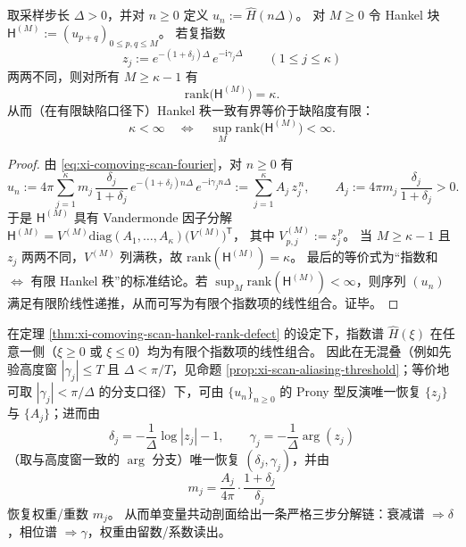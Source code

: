 \begin{theorem}\label{thm:xi-comoving-scan-hankel-rank-defect}
取采样步长 \(\Delta>0\)，并对 \(n\ge 0\) 定义
\(
u_n:=\widehat H(n\Delta)
\)。
对 \(M\ge 0\) 令 Hankel 块
\(
\mathsf H^{(M)}:=(u_{p+q})_{0\le p,q\le M}
\)。
若复指数
\[
z_j:=e^{-(1+\delta_j)\Delta}\,e^{-\mathrm{i}\gamma_j\Delta}\qquad(1\le j\le \kappa)
\]
两两不同，则对所有 \(M\ge \kappa-1\) 有
\[
\boxed{\;\mathrm{rank}\bigl(\mathsf H^{(M)}\bigr)=\kappa.\;}
\]
从而（在有限缺陷口径下）Hankel 秩一致有界等价于缺陷度有限：
\[
\kappa<\infty\quad\Longleftrightarrow\quad \sup_M\mathrm{rank}\bigl(\mathsf H^{(M)}\bigr)<\infty.
\]
\end{theorem}

\begin{proof}
由 \eqref{eq:xi-comoving-scan-fourier}，对 \(n\ge 0\) 有
\[
u_n
:=4\pi\sum_{j=1}^{\kappa}m_j\,\frac{\delta_j}{1+\delta_j}\,e^{-(1+\delta_j)n\Delta}\,e^{-\mathrm{i}\gamma_j n\Delta}
:=\sum_{j=1}^{\kappa}A_j\,z_j^{\,n},
\qquad
A_j:=4\pi m_j\,\frac{\delta_j}{1+\delta_j}>0.
\]
于是 \(\mathsf H^{(M)}\) 具有 Vandermonde 因子分解
\(
\mathsf H^{(M)}=V^{(M)}\mathrm{diag}(A_1,\dots,A_\kappa)\bigl(V^{(M)}\bigr)^{\mathsf T}
\)，
其中 \(V^{(M)}_{p,j}:=z_j^{\,p}\)。
当 \(M\ge\kappa-1\) 且 \(z_j\) 两两不同，\(V^{(M)}\) 列满秩，故 \(\mathrm{rank}(\mathsf H^{(M)})=\kappa\)。
最后的等价式为“指数和 \(\Longleftrightarrow\) 有限 Hankel 秩”的标准结论。若 \(\sup_M\mathrm{rank}(\mathsf H^{(M)})<\infty\)，则序列 \((u_n)\) 满足有限阶线性递推，从而可写为有限个指数项的线性组合。证毕。
\end{proof}

\begin{theorem}\label{thm:xi-comoving-scan-exponential-spectral-separation}
在定理 \ref{thm:xi-comoving-scan-hankel-rank-defect} 的设定下，指数谱 \(\widehat H(\xi)\) 在任意一侧（\(\xi\ge 0\) 或 \(\xi\le 0\)）均为有限个指数项的线性组合。
因此在无混叠（例如先验高度窗 \(|\gamma_j|\le T\) 且 \(\Delta<\pi/T\)，见命题 \ref{prop:xi-scan-aliasing-threshold}；等价地可取 \(|\gamma_j|<\pi/\Delta\) 的分支口径）下，可由 \(\{u_n\}_{n\ge 0}\) 的 Prony 型反演唯一恢复 \(\{z_j\}\) 与 \(\{A_j\}\)；进而由
\[
\boxed{\;
\delta_j= -\frac{1}{\Delta}\log|z_j|-1,\qquad
\gamma_j=-\frac{1}{\Delta}\arg(z_j)\;}
\]
（取与高度窗一致的 \(\arg\) 分支）唯一恢复 \((\delta_j,\gamma_j)\)，并由
\[
\boxed{\;
m_j=\frac{A_j}{4\pi}\cdot\frac{1+\delta_j}{\delta_j}\;}
\]
恢复权重/重数 \(m_j\)。
从而单变量共动剖面给出一条严格三步分解链：衰减谱 \(\Rightarrow\delta\)，相位谱 \(\Rightarrow\gamma\)，权重由留数/系数读出。
\end{theorem}

